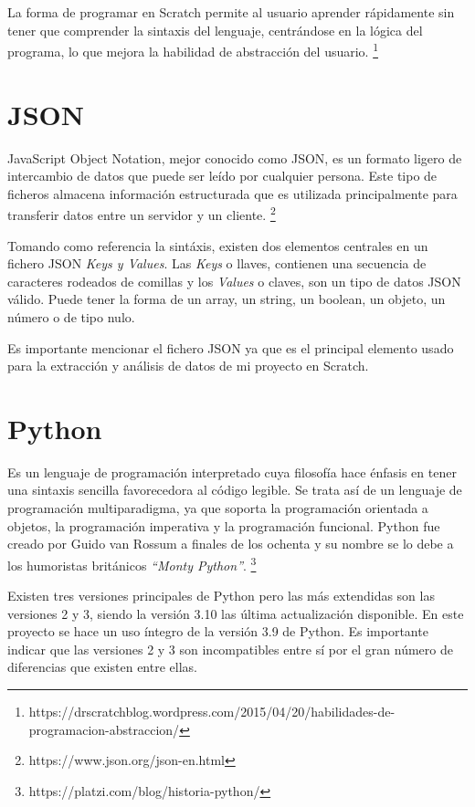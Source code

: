 \documentclass[a4paper, 12pt]{book}
\begin{document}
La forma de programar en Scratch permite al usuario aprender rápidamente sin tener que comprender la sintaxis del lenguaje, centrándose en la lógica del programa, lo que mejora la habilidad de abstracción del usuario. \footnote{https://drscratchblog.wordpress.com/2015/04/20/habilidades-de-programacion-abstraccion/} 

\section{JSON}
\label{sec:Json}

JavaScript Object Notation, mejor conocido como JSON, es un formato ligero de intercambio de datos que puede ser leído por cualquier persona. Este tipo de ficheros almacena información estructurada que es utilizada principalmente para transferir datos entre un servidor y un cliente. \footnote{https://www.json.org/json-en.html}

Tomando como referencia la sintáxis, existen dos elementos centrales en un fichero JSON \textit{Keys y Values}. Las \textit{Keys} o llaves, contienen una secuencia de caracteres rodeados de comillas y los \textit{Values} o claves, son un tipo de datos JSON válido. Puede tener la forma de un array, un string, un boolean, un objeto, un número o de tipo nulo. 

Es importante mencionar el fichero JSON ya que es el principal elemento usado para la extracción y análisis de datos de mi proyecto en Scratch.

\section{Python}
\label{sec:Python}

Es un lenguaje de programación interpretado cuya filosofía hace énfasis en tener una sintaxis sencilla favorecedora al código legible. Se trata así de un lenguaje de programación multiparadigma, ya que soporta la programación orientada a objetos, la programación imperativa y la programación funcional. Python fue creado por Guido van Rossum a finales de los ochenta y su nombre se lo debe a los humoristas británicos \textit{“Monty Python”}. \footnote{https://platzi.com/blog/historia-python/}

Existen tres versiones principales de Python pero las más extendidas son las versiones 2 y 3, siendo la versión 3.10 las última actualización disponible. En este proyecto se hace un uso íntegro de la versión 3.9 de Python. Es importante indicar que las versiones 2 y 3 son incompatibles entre sí por el gran número de diferencias que existen entre ellas.
\end{document}
